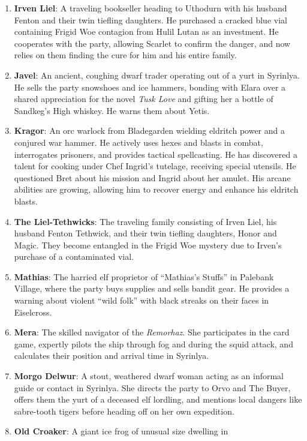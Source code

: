 \documentclass[
  letterpaper,12pt,twoside,twocolumn,openany,
  nodeprecatedcode,bg=full]{dndbook}
\begin{document}
\begin{enumerate}
\item
  \textbf{Irven Liel}: A traveling bookseller heading to Uthodurn with
  his husband Fenton and their twin tiefling daughters. He purchased a
  cracked blue vial containing Frigid Woe contagion from Hulil Lutan as
  an investment. He cooperates with the party, allowing Scarlet to
  confirm the danger, and now relies on them finding the cure for him
  and his entire family.
\item
  \textbf{Javel}: An ancient, coughing dwarf trader operating out of a
  yurt in Syrinlya. He sells the party snowshoes and ice hammers,
  bonding with Elara over a shared appreciation for the novel \emph{Tusk
  Love} and gifting her a bottle of Sandkeg's High whiskey. He warns
  them about Yetis.
\item
  \textbf{Kragor}: An orc warlock from Bladegarden wielding eldritch
  power and a conjured war hammer. He actively uses hexes and blasts in
  combat, interrogates prisoners, and provides tactical spellcasting. He
  has discovered a talent for cooking under Chef Ingrid's tutelage,
  receiving special utensils. He questioned Bret about his mission and
  Ingrid about her amulet. His arcane abilities are growing, allowing
  him to recover energy and enhance his eldritch blasts.
\item
  \textbf{The Liel-Tethwicks}: The traveling family consisting of Irven
  Liel, his husband Fenton Tethwick, and their twin tiefling daughters,
  Honor and Magic. They become entangled in the Frigid Woe mystery due
  to Irven's purchase of a contaminated vial.
\item
  \textbf{Mathias}: The harried elf proprietor of ``Mathias's Stuffs''
  in Palebank Village, where the party buys supplies and sells bandit
  gear. He provides a warning about violent ``wild folk'' with black
  streaks on their faces in Eiselcross.
\item
  \textbf{Mera}: The skilled navigator of the \emph{Remorhaz}. She
  participates in the card game, expertly pilots the ship through fog
  and during the squid attack, and calculates their position and arrival
  time in Syrinlya.
\item
  \textbf{Morgo Delwur}: A stout, weathered dwarf woman acting as an
  informal guide or contact in Syrinlya. She directs the party to Orvo
  and The Buyer, offers them the yurt of a deceased elf lordling, and
  mentions local dangers like sabre-tooth tigers before heading off on
  her own expedition.
\item
  \textbf{Old Croaker}: A giant ice frog of unusual size dwelling in

\end{enumerate}
\end{document}
